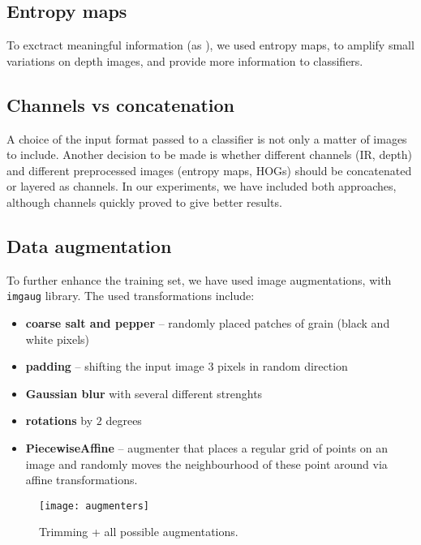         \subsection*{Entropy maps}
        To exctract meaningful information (as \citeauthor{rgbdhog}),
        we used entropy maps, to amplify small variations on depth images, and provide
        more information to classifiers.

        \subsection*{Channels vs concatenation}
        A choice of the input format passed to a classifier is not only a matter
        of images to include. Another decision to be made is whether different
        channels (IR, depth) and different preprocessed images (entropy maps,
        HOGs) should be concatenated or layered as channels. In our experiments,
        we have included both approaches, although channels quickly proved to
        give better results.

        \subsection*{Data augmentation}
        To further enhance the training set, we have used image augmentations, with \texttt{imgaug} \cite{imgaug} library.
        The used transformations include:
        \begin{itemize}
            \item \textbf{coarse salt and pepper} -- randomly placed patches of grain (black and white pixels)
            \item \textbf{padding} -- shifting the input image $3$ pixels in random direction
            \item \textbf{Gaussian blur} with several different strenghts
            \item \textbf{rotations} by $2$ degrees
            \item \textbf{PiecewiseAffine} -- augmenter that places a regular grid of points on an image and randomly moves the neighbourhood of these point around via affine transformations.
        \end{itemize}
        \begin{figure}[H]
        \caption{Trimming + all possible augmentations.}
        \centering
        \texttt{[image: augmenters]}
        \end{figure}

